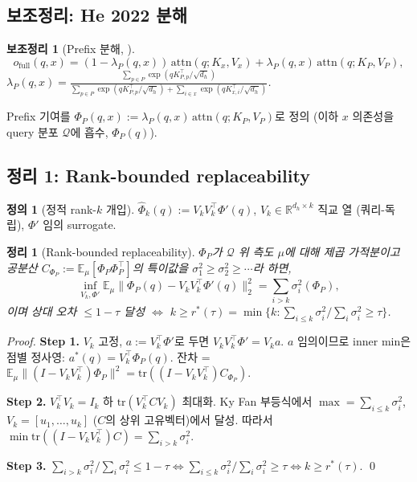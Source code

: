\documentclass[11pt]{article}
\newtheorem{theorem}{정리}
\newtheorem{lemma}{보조정리}
\theoremstyle{definition}
\newtheorem{definition}{정의}
\newcommand{\R}{\mathbb{R}}
\newcommand{\E}{\mathbb{E}}
\newcommand{\Phip}{\Phi_P}
\newcommand{\dh}{d_h}
\newcommand{\attn}{\mathrm{attn}}
\begin{document}
\subsection{보조정리: He 2022 분해}

\begin{lemma}[Prefix 분해, \citet{he2022unified}]
\label{lem:he}
\begin{equation}
o_{\mathrm{full}}(q,x) = (1-\lambda_P(q,x))\,\attn(q;K_x,V_x) + \lambda_P(q,x)\,\attn(q;K_P,V_P),
\end{equation}
$\lambda_P(q,x) = \frac{\sum_{p\in P}\exp(qK_{P,p}^\top/\sqrt{\dh})}{\sum_{p\in P}\exp(qK_{P,p}^\top/\sqrt{\dh}) + \sum_{i\in x}\exp(qK_{x,i}^\top/\sqrt{\dh})}$.
\end{lemma}

Prefix 기여를 $\Phip(q,x) := \lambda_P(q,x)\,\attn(q;K_P,V_P)$로 정의 (이하 $x$ 의존성을 query 분포 $\mathcal{Q}$에 흡수, $\Phip(q)$).

\subsection{정리 1: Rank-bounded replaceability}
\label{sec:thm1}

\begin{definition}[정적 rank-$k$ 개입]
$\widehat{\Phi}_k(q) := V_k V_k^\top \Phi'(q)$, $V_k \in \R^{\dh\times k}$ 직교 열 (쿼리-독립), $\Phi'$ 임의 surrogate.
\end{definition}

\begin{theorem}[Rank-bounded replaceability]
\label{thm:rank-bound}
$\Phip$가 $\mathcal{Q}$ 위 측도 $\mu$에 대해 제곱 가적분이고 공분산 $C_{\Phip} := \E_\mu[\Phip\Phip^\top]$의 특이값을 $\sigma_1^2 \ge \sigma_2^2 \ge \cdots$라 하면,
\begin{equation}
\inf_{V_k, \Phi'} \E_\mu \|\Phip(q) - V_k V_k^\top \Phi'(q)\|_2^2 = \sum_{i>k}\sigma_i^2(\Phip),
\end{equation}
이며 상대 오차 $\le 1-\tau$ 달성 $\Leftrightarrow$ $k \ge r^*(\tau) = \min\{k: \sum_{i\le k}\sigma_i^2/\sum_i\sigma_i^2 \ge \tau\}$.
\end{theorem}

\begin{proof}
\textbf{Step 1.} $V_k$ 고정, $a := V_k^\top\Phi'$로 두면 $V_k V_k^\top \Phi' = V_k a$. $a$ 임의이므로 inner min은 점별 정사영: $a^*(q) = V_k^\top\Phip(q)$. 잔차 = $\E_\mu \|(I - V_k V_k^\top)\Phip\|^2 = \mathrm{tr}((I-V_k V_k^\top)C_{\Phip})$.

\textbf{Step 2.} $V_k^\top V_k = I_k$ 하 $\mathrm{tr}(V_k^\top C V_k)$ 최대화. Ky Fan 부등식에서 $\max = \sum_{i\le k}\sigma_i^2$, $V_k = [u_1,\ldots,u_k]$ ($C$의 상위 고유벡터)에서 달성. 따라서 $\min\mathrm{tr}((I-V_k V_k^\top)C) = \sum_{i>k}\sigma_i^2$.

\textbf{Step 3.} $\sum_{i>k}\sigma_i^2/\sum_i\sigma_i^2 \le 1-\tau \Leftrightarrow \sum_{i\le k}\sigma_i^2/\sum_i\sigma_i^2 \ge \tau \Leftrightarrow k \ge r^*(\tau)$.
\qed
\end{proof}
\end{document}
